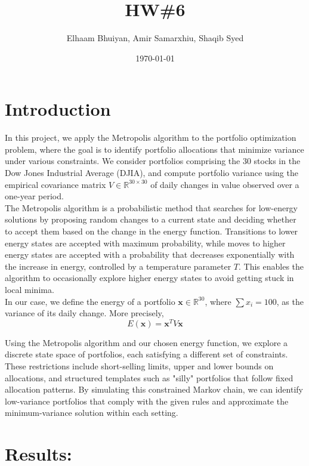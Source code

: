 \documentclass{report}
\title{HW\#6}
\author{
Elhaam Bhuiyan,
Amir Samarxhiu,
Shaqib Syed
}
\date{\today}
\begin{document}
\maketitle

\section*{Introduction}

In this project, we apply the Metropolis algorithm to the portfolio optimization problem, where the goal is to identify portfolio allocations that minimize variance under various constraints. We consider portfolios comprising the 30 stocks in the Dow Jones Industrial Average (DJIA), and compute portfolio variance using the empirical covariance matrix $V \in \mathbb{R}^{30 \times 30}$ of daily changes in value observed over a one-year period. \\

The Metropolis algorithm is a probabilistic method that searches for low-energy solutions by proposing random changes to a current state and deciding whether to accept them based on the change in the energy function. Transitions to lower energy states are accepted with maximum probability, while moves to higher energy states are accepted with a probability that decreases exponentially with the increase in energy, controlled by a temperature parameter $T$. This enables the algorithm to occasionally explore higher energy states to avoid getting stuck in local minima. \\

In our case, we define the energy of a portfolio $\mathbf{x} \in \mathbb{R}^{30}$, where $\sum x_i = 100$, as the variance of its daily change. More precisely,
\[
E(\mathbf{x}) = \mathbf{x}^TV\mathbf{x}
\]

Using the Metropolis algorithm and our chosen energy function, we explore a discrete state space of portfolios, each satisfying a different set of constraints. These restrictions include short-selling limits, upper and lower bounds on allocations, and structured templates such as "silly" portfolios that follow fixed allocation patterns. By simulating this constrained Markov chain, we can identify low-variance portfolios that comply with the given rules and approximate the minimum-variance solution within each setting. 

\pagebreak

\section*{Results:}
\end{document}

